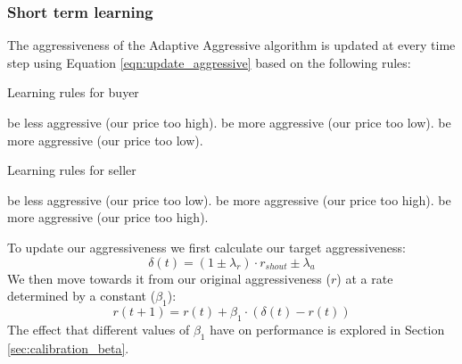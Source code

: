 \documentclass[preprint]{acm_proc_article-sp} %
\begin{document}
\subsubsection{Short term learning} \label{sec:AA_short_term_learning}
The aggressiveness of the Adaptive Aggressive algorithm is updated at every
time step using Equation \ref{eqn:update_aggressive} based on the following rules:

\begin{algorithm}[H]
  \caption{Learning rules for buyer}
  \begin{algorithmic}
            \STATE be less aggressive (our price too high).
        \ELSE
            \STATE be more aggressive (our price too low).
        \ENDIF
        \STATE be more aggressive (our price too low).
    \ENDIF
  \end{algorithmic}
  \label{alg:learning_rules_buyer}
\end{algorithm}

\begin{algorithm}[H]
  \caption{Learning rules for seller}
  \begin{algorithmic}
            \STATE be less aggressive (our price too low).
        \ELSE
            \STATE be more aggressive (our price too high).
        \ENDIF
        \STATE be more aggressive (our price too high).
    \ENDIF
  \end{algorithmic}
  \label{alg:learning_rules_seller}
\end{algorithm}

To update our aggressiveness we first calculate our target aggressiveness:
\begin{equation}
    \delta(t) = (1 \pm \lambda_r) \cdot r_{shout} \pm \lambda_a
\end{equation}
We then move towards it from our original aggressiveness ($r$) at 
a rate determined by a constant ($\beta_1$):
\begin{equation}
    r(t+1) = r(t) + \beta_1 \cdot (\delta(t) - r(t))
  \label{eqn:update_aggressive}
\end{equation}
The effect that different values of $\beta_1$ have on performance is explored
in Section \ref{sec:calibration_beta}.
\end{document}
